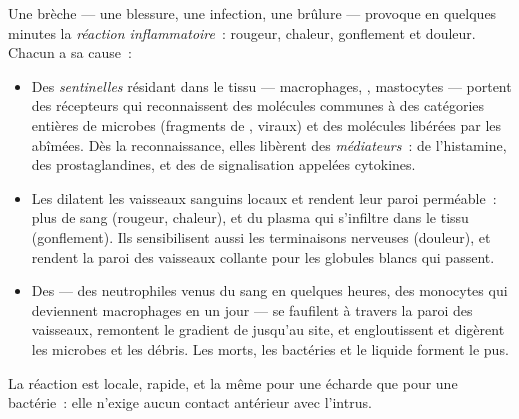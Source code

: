 \begin{proposition}\label{prop:g12:innate-immunity:inflammation}
Une brèche --- une blessure, une infection, une brûlure --- provoque
en quelques minutes la \emph{réaction
inflammatoire}~: rougeur, chaleur, gonflement et
douleur. Chacun a sa cause~:
\begin{itemize}
  \item Des \emph{ sentinelles} résidant dans le
        tissu --- macrophages, ,
        mastocytes --- portent des récepteurs qui reconnaissent des
        molécules communes à des catégories entières de microbes
        (fragments de ,  viraux)
        et des molécules libérées par les  abîmées. Dès la
        reconnaissance, elles libèrent des
        \emph{médiateurs}~: de
        l'histamine, des prostaglandines, et des  de
        signalisation appelées cytokines.
  \item Les  dilatent les vaisseaux sanguins locaux et
        rendent leur paroi perméable~: plus de sang (rougeur,
        chaleur), et du plasma qui s'infiltre dans le tissu
        (gonflement). Ils sensibilisent aussi les terminaisons
        nerveuses (douleur), et rendent la paroi des vaisseaux
        collante pour les globules blancs qui passent.
  \item Des \emph{} --- des neutrophiles venus du sang en
        quelques heures, des monocytes qui deviennent macrophages en
        un jour --- se faufilent à travers la paroi des vaisseaux,
        remontent le gradient de  jusqu'au site, et
        engloutissent et digèrent les microbes et les débris. Les
         morts, les bactéries et le liquide forment le pus.
\end{itemize}
La réaction est locale, rapide, et la même pour une écharde que pour
une bactérie~: elle n'exige aucun contact antérieur avec l'intrus.
\end{proposition}
